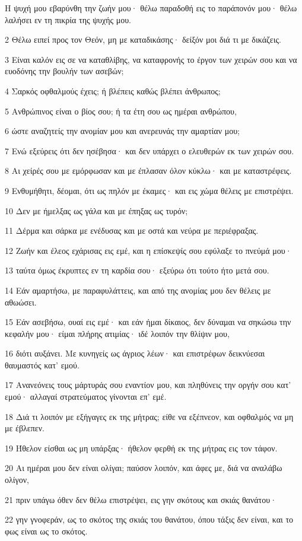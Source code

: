 \par Η ψυχή μου εβαρύνθη την ζωήν μου· θέλω παραδοθή εις το παράπονόν μου· θέλω λαλήσει εν τη πικρία της ψυχής μου.
\par 2 Θέλω ειπεί προς τον Θεόν, μη με καταδικάσης· δείξόν μοι διά τι με δικάζεις.
\par 3 Είναι καλόν εις σε να καταθλίβης, να καταφρονής το έργον των χειρών σου και να ευοδόνης την βουλήν των ασεβών;
\par 4 Σαρκός οφθαλμούς έχεις; ή βλέπεις καθώς βλέπει άνθρωπος;
\par 5 Ανθρώπινος είναι ο βίος σου; ή τα έτη σου ως ημέραι ανθρώπου,
\par 6 ώστε αναζητείς την ανομίαν μου και ανερευνάς την αμαρτίαν μου;
\par 7 Ενώ εξεύρεις ότι δεν ησέβησα· και δεν υπάρχει ο ελευθερών εκ των χειρών σου.
\par 8 Αι χείρές σου με εμόρφωσαν και με έπλασαν όλον κύκλω· και με καταστρέφεις.
\par 9 Ενθυμήθητι, δέομαι, ότι ως πηλόν με έκαμες· και εις χώμα θέλεις με επιστρέψει.
\par 10 Δεν με ήμελξας ως γάλα και με έπηξας ως τυρόν;
\par 11 Δέρμα και σάρκα με ενέδυσας και με οστά και νεύρα με περιέφραξας.
\par 12 Ζωήν και έλεος εχάρισας εις εμέ, και η επίσκεψίς σου εφύλαξε το πνεύμά μου·
\par 13 ταύτα όμως έκρυπτες εν τη καρδία σου· εξεύρω ότι τούτο ήτο μετά σου.
\par 14 Εάν αμαρτήσω, με παραφυλάττεις, και από της ανομίας μου δεν θέλεις με αθωώσει.
\par 15 Εάν ασεβήσω, ουαί εις εμέ· και εάν ήμαι δίκαιος, δεν δύναμαι να σηκώσω την κεφαλήν μου· είμαι πλήρης ατιμίας· ιδέ λοιπόν την θλίψιν μου,
\par 16 διότι αυξάνει. Με κυνηγείς ως άγριος λέων· και επιστρέφων δεικνύεσαι θαυμαστός κατ' εμού.
\par 17 Ανανεόνεις τους μάρτυράς σου εναντίον μου, και πληθύνεις την οργήν σου κατ' εμού· αλλαγαί στρατεύματος γίνονται επ' εμέ.
\par 18 Διά τι λοιπόν με εξήγαγες εκ της μήτρας; είθε να εξέπνεον, και οφθαλμός να μη με έβλεπεν.
\par 19 Ήθελον είσθαι ως μη υπάρξας· ήθελον φερθή εκ της μήτρας εις τον τάφον.
\par 20 Αι ημέραι μου δεν είναι ολίγαι; παύσον λοιπόν, και άφες με, διά να αναλάβω ολίγον,
\par 21 πριν υπάγω όθεν δεν θέλω επιστρέψει, εις γην σκότους και σκιάς θανάτου·
\par 22 γην γνοφεράν, ως το σκότος της σκιάς του θανάτου, όπου τάξις δεν είναι, και το φως είναι ως το σκότος.

